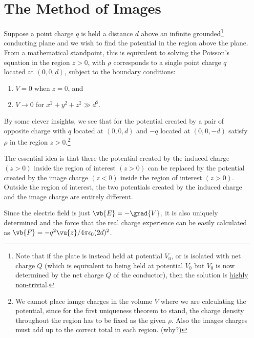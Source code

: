 \documentclass[english,a4paper,12pt]{report}
\begin{document}
\section{The Method of Images}

Suppose a point charge \(q\) is held a distance \(d\) above an infinite grounded\footnote{Note that if the plate is instead held at potential \(V_0 \), or is isolated with net charge \(Q\) (which is equivalent to being held at potential \(V_0 \) but \(V_0 \) is now determined by the net charge \(Q\) of the conductor), then the solution is \href{https:////physics.stackexchange.com//questions//314982//method-of-image-charges-for-a-point-charge-and-a-non-grounded-conducting-plane}{highly non-trivial}.} conducting plane and we wish to find the potential in the region above the plane. From a mathematical standpoint, this is equivalent to solving the Poisson's equation in the region \(z > 0\), with \(\rho \) corresponds to a single point charge  \(q\) located at \((0,0,d )\), subject to the boundary conditions: 

\begin{enumerate}
    \item \(V = 0\) when \(z = 0\), and \item \(V \rightarrow 0\) for \(x^2 + y^2 + z^2 \gg d^2\).	
\end{enumerate}

By some clever insights, we see that for the potential created by a pair of opposite charge with \(q\) located at \((0,0,d)\) and \(-q\) located at \((0,0,-d)\) satisfy \(\rho \) in the region \(z > 0\).\footnote{We cannot place iamge charges in the volume \(V\) where we are calculating the potential, since for the first uniqueness theorem to stand, the charge density throughout the region has to be fixed as the given \(\rho \). Also the images charges must add up to the correct total in each region. (why?)} 

The essential idea is that there the potential created by the induced charge \((z>0)\) inside the region of interest \((z>0)\) can be replaced by the potential created by the image charge \((z<0)\) inside the region of interest \((z>0)\). Outside the region of interest, the two potentials created by the induced charge and the image charge are entirely different.  

Since the electric field is just \(\vb{E} = -\grad{V} \), it is also uniquely determined and the force that the real charge experience can be easily calculated as \( \vb{F} = -q^2\vu{z}/ 4\pi \epsilon_0 (2d)^2\).
\end{document}
